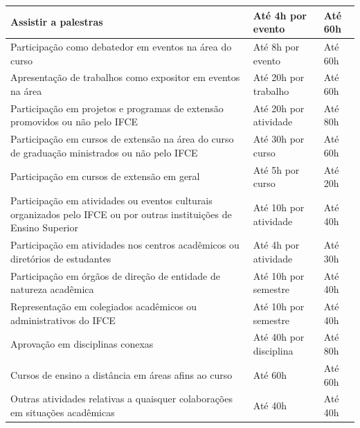 \begin{longtable}{|p{8.5cm}|p{3.5cm}|p{2cm}|}
	\hline
	
	Assistir a palestras & Até 4h por evento & Até 60h \\
	
	\hline
	
	Participação como debatedor em eventos na área do curso & Até 8h por evento & Até 60h \\
	
	\hline
	
	Apresentação de trabalhos como expositor em eventos na área & Até 20h por trabalho & Até 60h \\
	
	\hline
	
	Participação em projetos e programas de extensão promovidos ou não pelo IFCE & Até 20h por atividade & Até 80h \\
	
	\hline
	
	Participação em cursos de extensão na área do curso de graduação ministrados ou não pelo IFCE & Até 30h por curso & Até 60h \\
	
	\hline
	
	Participação em cursos de extensão em geral & Até 5h por curso & Até 20h \\
	
	\hline
	
	Participação em atividades ou eventos culturais organizados pelo IFCE ou por outras instituições de Ensino Superior & Até 10h por atividade & Até 40h \\
	
	\hline
	
	Participação em atividades nos centros acadêmicos ou diretórios de estudantes & Até 4h por atividade & Até 30h \\
	
	\hline
	
	Participação em órgãos de direção de entidade de natureza acadêmica & Até 10h por semestre & Até 40h \\
	
	\hline
	
	Representação em colegiados acadêmicos ou administrativos do IFCE & Até 10h por semestre & Até 40h \\
	
	\hline
	
	Aprovação em disciplinas conexas & Até 40h por disciplina & Até 80h \\
	
	\hline
	
	Cursos de ensino a distância em áreas afins ao curso & Até 60h & Até 60h \\
	
	\hline
	
	Outras atividades relativas a quaisquer colaborações em situações acadêmicas & Até 40h & Até 40h \\
	
	\hline
	
\end{longtable} 

